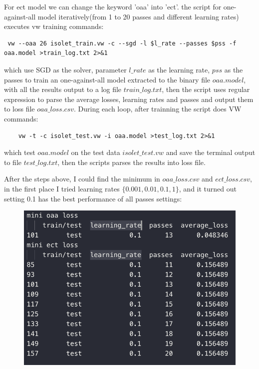 \documentclass[a4paper,12pt]{article}
\begin{document}
For ect model we can change the keyword 'oaa' into 'ect'. the script for one-against-all model iteratively(from 1 to 20 passes and different learning rates) executes vw training commands:
\begin{lstlisting}
 vw --oaa 26 isolet_train.vw -c --sgd -l $l_rate --passes $pss -f oaa.model >train_log.txt 2>&1
\end{lstlisting}
which use SGD as the solver, parameter $l\_rate$ as the learning rate, $pss$ as the passes to train an one-against-all model extracted to the binary file $oaa.model$, 
with all the results output to a log file $train\_log.txt$, then the script uses regular expression to parse the average losses, learning rates and passes and output them to loss file $oaa\_loss.csv$. During
each loop, after trainning the script does VW commands:
\begin{lstlisting}
    vw -t -c isolet_test.vw -i oaa.model >test_log.txt 2>&1
\end{lstlisting}
which test $oaa.model$ on the test data $isolet\_test.vw$ and save the terminal output to file $test\_log.txt$, then the scripts parses the results into loss file.

After the steps above, I could find the minimum in $oaa\_loss.csv$ and $ect\_loss.csv$, in the first place I tried learning rates $\{0.001, 0.01, 0.1,  1\}$,
and it turned out setting 0.1 has the best performance of all passes settings:
\begin{figure}[htbp]
    \centering
    \includegraphics[width = .5\textwidth]{first_result}
\end{figure}
\end{document}
